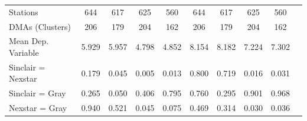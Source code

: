 {\begin{tabular}{l*{9}{c}}
Stations        &      644   &      617   &      625   &      560   &      644   &      617   &      625   &      560   \\
DMAs (Clusters) &      206   &      179   &      204   &      162   &      206   &      179   &      204   &      162   \\
Mean Dep. Variable&    5.929   &    5.957   &    4.798   &    4.852   &    8.154   &    8.182   &    7.224   &    7.302   \\
\midrule Sinclair = Nexstar&    0.179   &    0.045   &    0.005   &    0.013   &    0.800   &    0.719   &    0.016   &    0.031   \\
Sinclair = Gray &    0.265   &    0.050   &    0.406   &    0.795   &    0.760   &    0.295   &    0.901   &    0.968   \\
Nexstar = Gray  &    0.940   &    0.521   &    0.045   &    0.075   &    0.469   &    0.314   &    0.030   &    0.036   \\
\bottomrule
\end{tabular}
}
